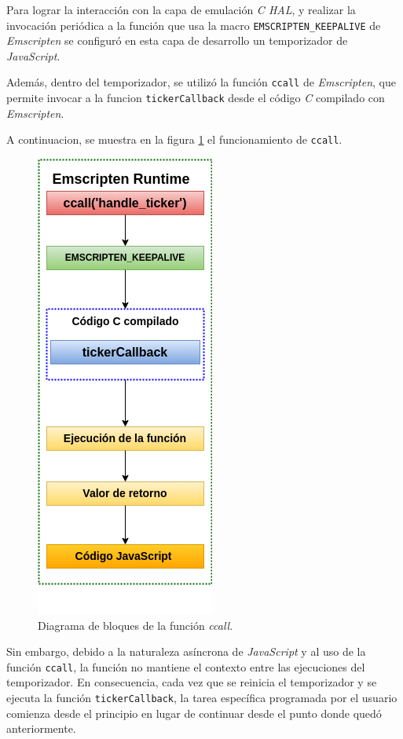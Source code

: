 Para lograr la interacción con la capa de emulación \textit{C HAL}, y realizar la invocación periódica a la función que usa la macro \texttt{EMSCRIPTEN\_KEEPALIVE} de \textit{Emscripten} se configuró en esta capa de desarrollo un temporizador de \textit{JavaScript}.

Además, dentro del temporizador, se utilizó la función \texttt{ccall} de \textit{Emscripten}, que permite invocar a la funcion \texttt{tickerCallback} desde el código \textit{C} compilado con \textit{Emscripten}. 

A continuacion, se muestra en la figura  \ref{fig:ccall} el funcionamiento de \texttt{ccall}. 

\begin{figure}[ht]
	\centering
	\includegraphics[scale=.49]{./Figures/ccall.png}
	\caption{Diagrama de bloques de la función \textit{ccall}.}
	\label{fig:ccall}
\end{figure}

Sin embargo, debido a la naturaleza asíncrona de \textit{JavaScript} y al uso de la función \texttt{ccall}, la función no mantiene el contexto entre las ejecuciones del temporizador. En consecuencia, cada vez que se reinicia el temporizador y se ejecuta la función  \texttt{tickerCallback}, la tarea específica programada por el usuario comienza desde el principio en lugar de continuar desde el punto donde quedó anteriormente. 

